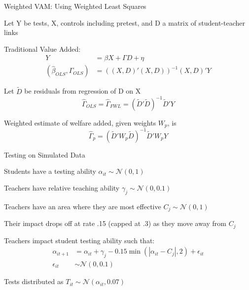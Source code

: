 \documentclass[t,aspectratio=169,11pt]{beamer}
\newenvironment{wideitemize}{\itemize\addtolength{\itemsep}{14pt}}{\enditemize}
\begin{document}
\begin{frame}{Weighted VAM: Using Weighted Least Squares}

\begin{wideitemize}
 \item Let Y be tests, X, controls including pretest, and D a matrix of student-teacher links
\item  Traditional Value Added:
    \begin{align*}
    Y &= \beta X + \Gamma D + \eta \\
    (\hat{\beta}_{OLS},\hat{\Gamma}_{OLS}) &= \left ((X,D)'(X,D) \right ) ^{-1} (X,D)' Y 
    \end{align*}
\item Let $\tilde{D}$ be residuals from regression of D on X \citep{frisch1933partial}
\[
\hat{\Gamma}_{OLS} = \hat{\Gamma}_{FWL} =  (\tilde{D}'\tilde{D}  ) ^{-1} \tilde{D}' Y
\]
\item Weighted estimate of welfare added, given weights $W_p$, is
\[
\hat{\Gamma}_{p} = \left (\tilde{D}'W_p\tilde{D} \right ) ^{-1} \tilde{D}'W_p Y
\]


\end{wideitemize}

\end{frame}





\begin{frame}{Testing on Simulated Data  }


\begin{wideitemize}
\item Students have a testing ability $\alpha_{it} \sim \mathcal{N}(0,1)$
\item Teachers have relative teaching ability  $\gamma_{j} \sim \mathcal{N}(0,0.1)$
\item Teachers have an area where they are most effective $C_{j} \sim  \mathcal{N}(0,1)$
\item Their impact drops off at rate .15 (capped at .3) as they move away from $C_{j}$
\item Teachers impact student testing ability such that: 
\begin{align*}
\alpha_{it+1} &= \alpha_{it} + \gamma_{j} - 0.15\min(|\alpha_{it} - C_{j}|, 2)  + \epsilon_{it} \\
\epsilon_{it} &\sim  \mathcal{N}(0,0.1) 
\end{align*}


\item Tests distributed as $ T_{it} \sim \mathcal{N}(\alpha_{it},0.07)$
\end{wideitemize}
\end{frame}
\end{document}
